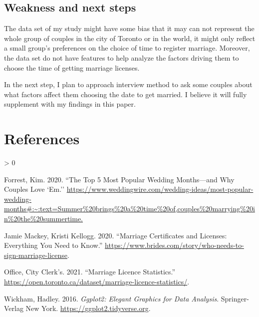 \documentclass[
]{article}
\newlength{\cslhangindent}
\newenvironment{CSLReferences}[2] %
 {%
  \setlength{\parindent}{0pt}
  \ifodd #1 \everypar{\setlength{\hangindent}{\cslhangindent}}\ignorespaces\fi
  \ifnum #2 > 0
  \setlength{\parskip}{#2\baselineskip}
  \fi
 }%
 {}
\begin{document}
\hypertarget{weakness-and-next-steps}{%
\subsection{Weakness and next steps}\label{weakness-and-next-steps}}

The data set of my study might have some bias that it may can not represent the whole group of couples in the city of Toronto or in the world, it might only reflect a small group's preferences on the choice of time to register marriage. Moreover, the data set do not have features to help analyze the factors driving them to choose the time of getting marriage licenses.

In the next step, I plan to approach interview method to ask some couples about what factors affect them choosing the date to get married. I believe it will fully supplement with my findings in this paper.

\newpage

\hypertarget{references}{%
\section*{References}\label{references}}

\hypertarget{refs}{}
\begin{CSLReferences}{1}{0}
\leavevmode\hypertarget{ref-Popular}{}%
Forrest, Kim. 2020. {``The Top 5 Most Popular Wedding Months---and Why Couples Love `Em.''} \url{https://www.weddingwire.com/wedding-ideas/most-popular-wedding-months\#:~:text=Summer\%20brings\%20a\%20time\%20of,couples\%20marrying\%20in\%20the\%20summertime.}

\leavevmode\hypertarget{ref-Define}{}%
Jamie Mackey, Kristi Kellogg. 2020. {``Marriage Certificates and Licenses: Everything You Need to Know.''} \url{https://www.brides.com/story/who-needs-to-sign-marriage-license}.

\leavevmode\hypertarget{ref-datasource}{}%
Office, City Clerk's. 2021. {``Marriage Licence Statistics.''} \url{https://open.toronto.ca/dataset/marriage-licence-statistics/}.

\leavevmode\hypertarget{ref-ggplot}{}%
Wickham, Hadley. 2016. \emph{Ggplot2: Elegant Graphics for Data Analysis}. Springer-Verlag New York. \url{https://ggplot2.tidyverse.org}.

\end{CSLReferences}
\end{document}
